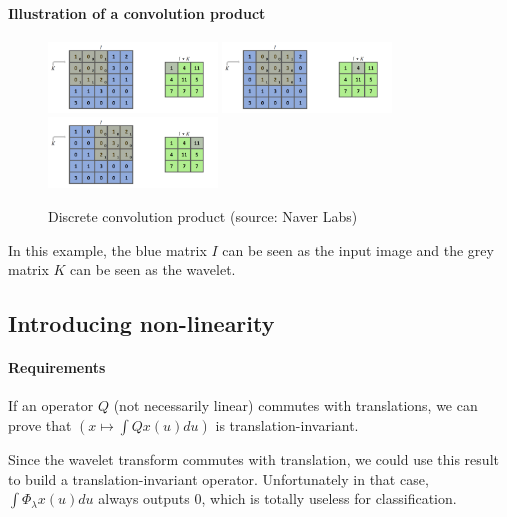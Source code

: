 \documentclass[10pt]{beamer}
\begin{document}
\begin{darkframes}
    
    \begin{frame}[label=conv_ex]{\subsecname}
    \framesubtitle{Illustration of a convolution product}
    \begin{figure}
        \centering
        \includegraphics[width=0.40\textwidth]{resources/convolution/Conv_1.png}
        \hspace{0.01\textwidth}
        \includegraphics[width=0.40\textwidth]{resources/convolution/Conv_2.png}
        \vspace{0.015\textheight}
        \includegraphics[width=0.40\textwidth]{resources/convolution/Conv_3.png}
        \caption{Discrete convolution product (source: Naver Labs)}
    \end{figure}
    In this example, the blue matrix $I$ can be seen as the input image and the grey matrix $K$ can be seen as the wavelet.
    \end{frame}
    
    
    \subsection{Introducing non-linearity}
    
    
    \begin{frame}[label=non-lin1]{\subsecname}
    \framesubtitle{Requirements}
    If an operator $Q$ (not necessarily linear) commutes with translations, we can prove that $\left( x \mapsto \int Qx(u) du \right)$ is translation-invariant.
    
    Since the wavelet transform commutes with translation, we could use this result to build a translation-invariant operator. Unfortunately in that case, $\int \Phi_\lambda x(u) du$ always outputs $0$, which is totally useless for classification.
    

\end{frame}
\end{darkframes}
\end{document}
